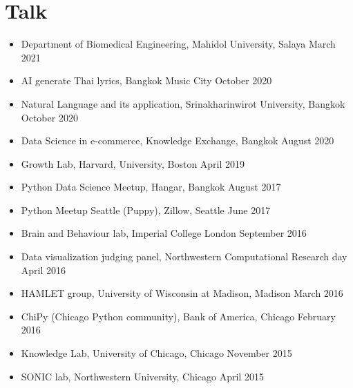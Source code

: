 \section{\sc Talk}

\begin{itemize}[leftmargin=0cm, label={}]

\item Department of Biomedical Engineering, Mahidol University, Salaya \hfill March 2021
\item AI generate Thai lyrics, Bangkok Music City \hfill October 2020
\item Natural Language and its application, Srinakharinwirot University, Bangkok \hfill October 2020
\item Data Science in e-commerce, Knowledge Exchange, Bangkok \hfill August 2020
\item Growth Lab, Harvard, University, Boston \hfill April 2019
\item Python Data Science  Meetup, Hangar, Bangkok \hfill August 2017
\item Python Meetup Seattle (Puppy), Zillow, Seattle \hfill June 2017
\item Brain and Behaviour lab, Imperial College London \hfill September 2016
\item Data visualization judging panel, Northwestern Computational Research day \hfill April 2016
\item HAMLET group, University of Wisconsin at Madison, Madison \hfill March 2016
\item ChiPy (Chicago Python community), Bank of America, Chicago \hfill February 2016
\item Knowledge Lab, University of Chicago, Chicago \hfill November 2015
\item SONIC lab, Northwestern University, Chicago   \hfill April 2015

\end{itemize}